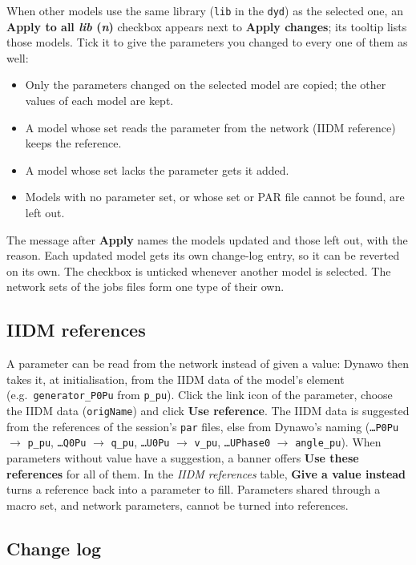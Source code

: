 \documentclass[a4paper,11pt]{article}
\newcommand{\code}[1]{\texttt{\small #1}}
\newcommand{\ftype}[1]{\texttt{\small\color{rteblu}#1}}
\begin{document}
When other models use the same library (\code{lib} in the \ftype{dyd}) as the
selected one, an \textbf{Apply to all \textit{lib} (\textit{n})} checkbox appears
next to \textbf{Apply changes}; its tooltip lists those models. Tick it to give
the parameters you changed to every one of them as well:

\begin{itemize}
  \item Only the parameters changed on the selected model are copied; the other
    values of each model are kept.
  \item A model whose set reads the parameter from the network (IIDM reference)
    keeps the reference.
  \item A model whose set lacks the parameter gets it added.
  \item Models with no parameter set, or whose set or PAR file cannot be found,
    are left out.
\end{itemize}

The message after \textbf{Apply} names the models updated and those left out,
with the reason. Each updated model gets its own change-log entry, so it can be
reverted on its own. The checkbox is unticked whenever another model is
selected. The network sets of the jobs files form one type of their own.

\subsection{IIDM references}

A parameter can be read from the network instead of given a value: Dynawo then
takes it, at initialisation, from the IIDM data of the model's element (e.g.\
\code{generator\_P0Pu} from \code{p\_pu}). Click the link icon of the
parameter, choose the IIDM data (\code{origName}) and click \textbf{Use
reference}. The IIDM data is suggested from the references of the session's
\ftype{par} files, else from Dynawo's naming (\code{\ldots P0Pu} $\to$
\code{p\_pu}, \code{\ldots Q0Pu} $\to$ \code{q\_pu}, \code{\ldots U0Pu}
$\to$ \code{v\_pu}, \code{\ldots UPhase0} $\to$ \code{angle\_pu}). When
parameters without value have a suggestion, a banner offers \textbf{Use these
references} for all of them. In the \emph{IIDM references} table,
\textbf{Give a value instead} turns a reference back into a parameter to fill.
Parameters shared through a macro set, and network parameters, cannot be turned
into references.

\subsection{Change log}
\end{document}
